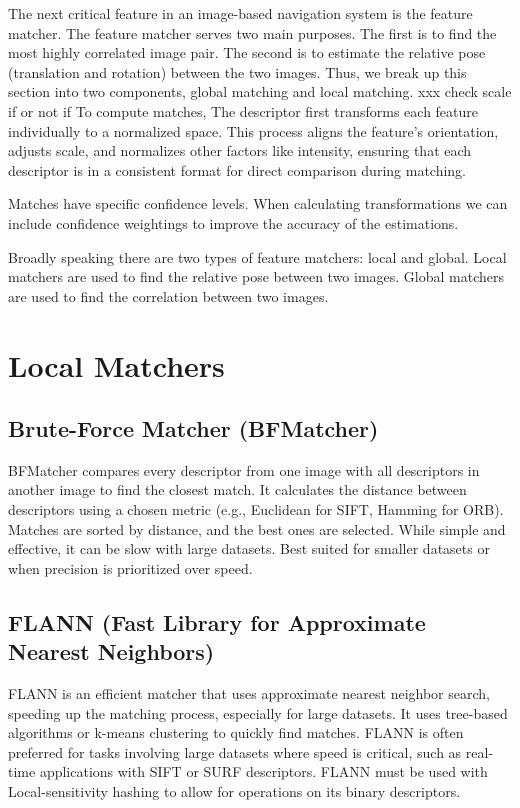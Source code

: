 The next critical feature in an image-based navigation system is the feature matcher. The feature matcher serves two main purposes. The first is to find the most highly correlated image pair. The second is to estimate the relative pose (translation and rotation) between the two images. Thus, we break up this section into two components, global matching and local matching. 
xxx check scale if or not if
To compute matches, The descriptor first transforms each feature individually to a normalized space. This process aligns the feature’s orientation, adjusts scale, and normalizes other factors like intensity, ensuring that each descriptor is in a consistent format for direct comparison during matching.


Matches have specific confidence levels. When calculating transformations we can include confidence weightings to improve the accuracy of the estimations. 

Broadly speaking there are two types of feature matchers: local and global. Local matchers are used to find the relative pose between two images. Global matchers are used to find the correlation between two images.

\section*{Local Matchers}
\subsection*{Brute-Force Matcher (BFMatcher)} BFMatcher compares every descriptor from one image with all descriptors in another image to find the closest match. It calculates the distance between descriptors using a chosen metric (e.g., Euclidean for SIFT, Hamming for ORB). Matches are sorted by distance, and the best ones are selected. While simple and effective, it can be slow with large datasets. Best suited for smaller datasets or when precision is prioritized over speed.

\subsection*{FLANN (Fast Library for Approximate Nearest Neighbors)} FLANN is an efficient matcher that uses approximate nearest neighbor search, speeding up the matching process, especially for large datasets. It uses tree-based algorithms or k-means clustering to quickly find matches. FLANN is often preferred for tasks involving large datasets where speed is critical, such as real-time applications with SIFT or SURF descriptors. FLANN must be used with Local-sensitivity hashing to allow for operations on its binary descriptors. 



